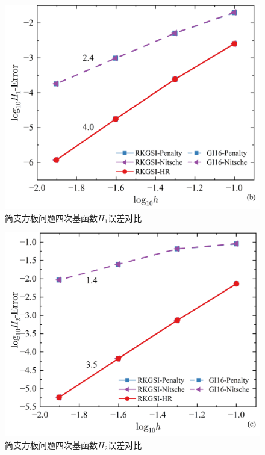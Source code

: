 \begin{figure}[H]
    \centering
    \includegraphics[scale=0.5]{figure/PHR/R/QH1.png}
    \caption{简支方板问题四次基函数$H_1$误差对比}
\end{figure}
\newpage
\begin{figure}[H]
    \centering
    \includegraphics[scale=0.5]{figure/PHR/R/QH2.png}
    \caption{简支方板问题四次基函数$H_2$误差对比}
\end{figure}
